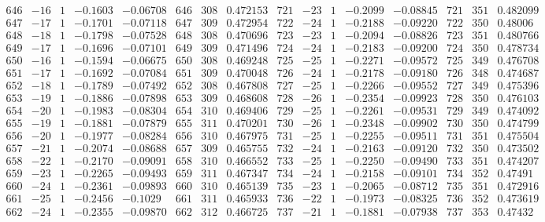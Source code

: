 \documentclass[11pt,reqno,a4letter]{article}
\numberwithin{figure}{section}
\numberwithin{table}{section}
\theoremstyle{plain}
\numberwithin{theorem}{section}
\theoremstyle{definition}
\begin{document}
\begin{table}[ht]
\begin{equation*}
{\begin{array}{ccccc|ccc|ccccc|ccc}
 646 & -16 & 1 & -0.1603 & -0.06708 & 646 & 308 & 0.472153 & 721 & -23 & 1 & -0.2099 & -0.08845 & 721 & 351 & 0.482099 \\
 647 & -17 & 1 & -0.1701 & -0.07118 & 647 & 309 & 0.472954 & 722 & -24 & 1 & -0.2188 & -0.09220 & 722 & 350 & 0.48006 \\
 648 & -18 & 1 & -0.1798 & -0.07528 & 648 & 308 & 0.470696 & 723 & -23 & 1 & -0.2094 & -0.08826 & 723 & 351 & 0.480766 \\
 649 & -17 & 1 & -0.1696 & -0.07101 & 649 & 309 & 0.471496 & 724 & -24 & 1 & -0.2183 & -0.09200 & 724 & 350 & 0.478734 \\
 650 & -16 & 1 & -0.1594 & -0.06675 & 650 & 308 & 0.469248 & 725 & -25 & 1 & -0.2271 & -0.09572 & 725 & 349 & 0.476708 \\
 651 & -17 & 1 & -0.1692 & -0.07084 & 651 & 309 & 0.470048 & 726 & -24 & 1 & -0.2178 & -0.09180 & 726 & 348 & 0.474687 \\
 652 & -18 & 1 & -0.1789 & -0.07492 & 652 & 308 & 0.467808 & 727 & -25 & 1 & -0.2266 & -0.09552 & 727 & 349 & 0.475396 \\
 653 & -19 & 1 & -0.1886 & -0.07898 & 653 & 309 & 0.468608 & 728 & -26 & 1 & -0.2354 & -0.09923 & 728 & 350 & 0.476103 \\
 654 & -20 & 1 & -0.1983 & -0.08304 & 654 & 310 & 0.469406 & 729 & -25 & 1 & -0.2261 & -0.09531 & 729 & 349 & 0.474092 \\
 655 & -19 & 1 & -0.1881 & -0.07879 & 655 & 311 & 0.470201 & 730 & -26 & 1 & -0.2348 & -0.09902 & 730 & 350 & 0.474799 \\
 656 & -20 & 1 & -0.1977 & -0.08284 & 656 & 310 & 0.467975 & 731 & -25 & 1 & -0.2255 & -0.09511 & 731 & 351 & 0.475504 \\
 657 & -21 & 1 & -0.2074 & -0.08688 & 657 & 309 & 0.465755 & 732 & -24 & 1 & -0.2163 & -0.09120 & 732 & 350 & 0.473502 \\
 658 & -22 & 1 & -0.2170 & -0.09091 & 658 & 310 & 0.466552 & 733 & -25 & 1 & -0.2250 & -0.09490 & 733 & 351 & 0.474207 \\
 659 & -23 & 1 & -0.2265 & -0.09493 & 659 & 311 & 0.467347 & 734 & -24 & 1 & -0.2158 & -0.09101 & 734 & 352 & 0.47491 \\
 660 & -24 & 1 & -0.2361 & -0.09893 & 660 & 310 & 0.465139 & 735 & -23 & 1 & -0.2065 & -0.08712 & 735 & 351 & 0.472916 \\
 661 & -25 & 1 & -0.2456 & -0.1029 & 661 & 311 & 0.465933 & 736 & -22 & 1 & -0.1973 & -0.08325 & 736 & 352 & 0.473619 \\
 662 & -24 & 1 & -0.2355 & -0.09870 & 662 & 312 & 0.466725 & 737 & -21 & 1 & -0.1881 & -0.07938 & 737 & 353 & 0.47432 \\

\end{array}}
\end{equation*}
\end{table}
\end{document}
